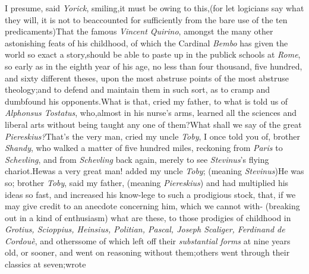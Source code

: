 \documentclass{article}
\begin{document}
I presume, said \textit{Yorick}, smiling,\tsk it must be owing to
this,\tsk (for let logi\-cians say what they will,
it is not to be\break accounted
for sufficiently from the bare use of the ten predicaments)\tsh That
the famous \textit{Vincent Quirino}, amongst the many other astonishing feats of
his childhood, of which the Cardinal \textit{Bembo} has given the world so exact
a story,\tsk should be able to paste up in the publick schools
at \textit{Rome}, so early as in the eighth year of his age, no less than four
thousand, five hundred, and sixty different theses, upon the most abstruse points of
the most abstruse theology;\tsk and to defend and maintain them in such sort, as to
cramp and dumbfound his opponents.\tsh\break What is that, cried my father, to what
is told us of \textit{Alphonsus Tostatus},
who,\break almost in his nurse’s arms, learned
all the sciences and liberal arts without being taught any one of them?\tsh What
shall we say of the great \textit{Piereskius?}\tsk\break That’s the very man, cried
my uncle \textit{Toby}, I once told you of, brother \textit{Shandy}, who walked a
matter of five hundred miles, reckoning from \textit{Paris} to \textit{Schevling},
and from \textit{Schevling} back again, merely to see \textit{Stevinus}’s flying
chariot.\tsh He\break was a very great man! added my uncle \textit{Toby}; (meaning
\textit{Stevinus})\tsk He was so;
brother \textit{Toby}, said my father, (meaning
\textit{Piereskius})\tsk\etp
and had multiplied his ideas so fast, and increased his
know-\break lege to such a prodigious stock, that, if we may give credit to an anecdote
concerning him, which we cannot with-\break{}
(breaking out in a kind of enthusiasm)\break
\tsk what are
these, to those prodigies of childhood in \textit{Grotius, Scioppius, Heinsius,
Politian, Pascal, Joseph Scaliger, Ferdinand de Cordouè}, and others\tsk some of
which left off their \textit{substantial forms} at
nine years old, or sooner, and went on reasoning without them;\tsk others went
through their classics at seven;\tsk wrote \break
\end{document}
